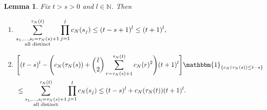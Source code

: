 \documentclass[12pt,authoryear]{article}
\newtheorem{lemma}{Lemma}
\theoremstyle{definition}
\newcommand{\1}[1]{\mathbbm{1}_{#1}}
\begin{document}
\begin{lemma}\label{thm:sumprod1}
Fix $t > s > 0$ and $l\in\mathbb{N}$.
Then
\begin{enumerate}[label=$(\alph*)$]
\item \label{thm:sumprod1_a} %
$\begin{aligned}[t]
\sum_{\substack{ s_1, \dots, s_l =\tau_N(s)+1 \\ \text{\normalfont{all distinct}} }}^{\tau_N(t)}
        \prod_{j=1}^l c_N(s_j)
    \leq (t - s + 1)^l \leq (t+1)^l,
\end{aligned}$
\item \label{thm:sumprod1_b} %
$\begin{aligned}[t]
&\Bigg[ (t - s)^l - \Bigg( c_N(\tau_N(s)) + \binom{l}{2} \sum_{r = \tau_N(s) + 1}^{\tau_N(t)} c_N(r)^2 \Bigg) (t + 1)^l \Bigg]  \1{\{ c_N(\tau_N(s)) \leq t - s\}} \\
&\leq \sum_{\substack{ s_1, \dots, s_l =\tau_N(s) + 1 \\ \text{\normalfont{all distinct}} }}^{\tau_N(t)} \prod_{j=1}^l c_N(s_j) \leq (t - s)^l + c_N(\tau_N(t)) (t+1)^l.
\end{aligned}$
\end{enumerate}
\end{lemma}
\end{document}
